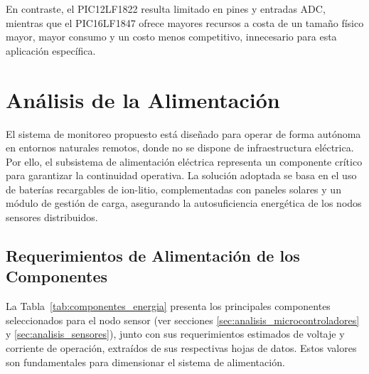 En contraste, el PIC12LF1822 resulta limitado en pines y entradas ADC, mientras que el PIC16LF1847 ofrece mayores recursos a costa de un tamaño físico mayor, mayor consumo y un costo menos competitivo, innecesario para esta aplicación específica.





\section{Análisis de la Alimentación}
\label{sec:analisis_alimentacion}

El sistema de monitoreo propuesto está diseñado para operar de forma autónoma en entornos naturales remotos, donde no se dispone de infraestructura eléctrica. Por ello, el subsistema de alimentación eléctrica representa un componente crítico para garantizar la continuidad operativa. La solución adoptada se basa en el uso de baterías recargables de ion-litio, complementadas con paneles solares y un módulo de gestión de carga, asegurando la autosuficiencia energética de los nodos sensores distribuidos.

\subsection{Requerimientos de Alimentación de los Componentes}
\label{subsec:reqs_alimentacion}

La Tabla~\ref{tab:componentes_energia} presenta los principales componentes seleccionados para el nodo sensor (ver secciones \ref{sec:analisis_microcontroladores} y \ref{sec:analisis_sensores}), junto con sus requerimientos estimados de voltaje y corriente de operación, extraídos de sus respectivas hojas de datos. Estos valores son fundamentales para dimensionar el sistema de alimentación.

%




